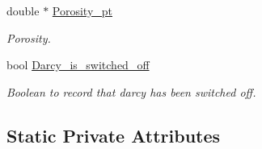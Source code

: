 \begin{DoxyCompactItemize}
double $\ast$ \hyperlink{classoomph_1_1AxisymmetricPoroelasticityEquations_a5db217e9827f25433e842b7964db6a50}{Porosity\+\_\+pt}
\begin{DoxyCompactList}\small\item\em Porosity. \end{DoxyCompactList}\item 
bool \hyperlink{classoomph_1_1AxisymmetricPoroelasticityEquations_ace440d368740576f62fd73af61a1644f}{Darcy\+\_\+is\+\_\+switched\+\_\+off}
\begin{DoxyCompactList}\small\item\em Boolean to record that darcy has been switched off. \end{DoxyCompactList}\end{DoxyCompactItemize}
\subsection*{Static Private Attributes}
